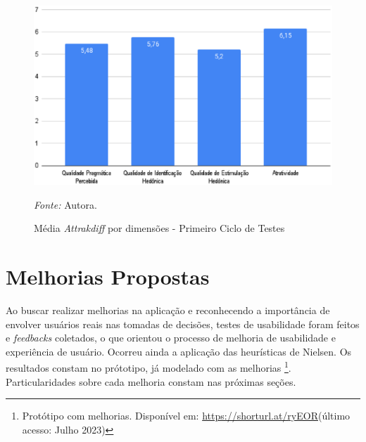 \newpage

\begin{figure}[h!]
	\centering
	\caption{Média \textit{Attrakdiff} por dimensões - Primeiro Ciclo de Testes}
	\begin{adjustbox}{center}
		\includegraphics[width=1\textwidth]{figuras/media-separada.eps}
	\end{adjustbox}
	\begin{tablenotes}[flushleft]
		\centering
		\item \textit{Fonte:} Autora.
	\end{tablenotes}
	\label{fig21}
\end{figure}

\section{Melhorias Propostas}
\label{sec:Melhorias Propostas}
Ao buscar realizar melhorias na aplicação e reconhecendo a importância de envolver usuários reais nas tomadas de decisões, testes de usabilidade foram feitos e \textit{feedbacks} coletados, 
o que orientou o processo de melhoria de usabilidade e experiência de usuário. Ocorreu ainda a aplicação das heurísticas de Nielsen. Os resultados constam no prótotipo, já modelado com as melhorias
\footnote{Protótipo com melhorias. Disponível em: \url{https://shorturl.at/ryEOR}(último acesso: Julho 2023)}. Particularidades sobre cada melhoria constam nas próximas seções.

